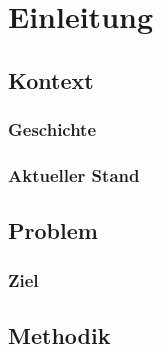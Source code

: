 \chapter{Einleitung}
\section{Kontext} %
\subsection{Geschichte}
\subsection{Aktueller Stand}
\section{Problem} %
\subsection{Ziel} %
\section{Methodik} %